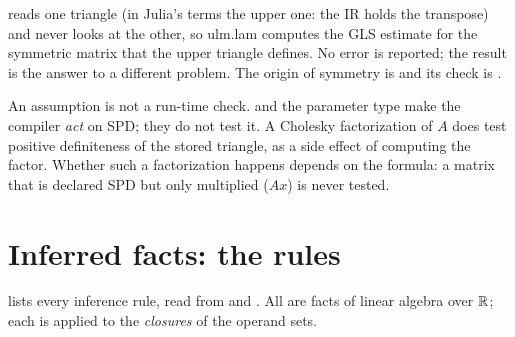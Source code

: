  reads one triangle (in Julia's terms the upper one: the IR
holds the transpose) and never looks at the other, so ulm.lam computes the
GLS estimate for the symmetric matrix that the upper triangle defines. No
error is reported; the result is the answer to a different problem. The
origin of symmetry is \Odecl{} and its check is \Onone.

\begin{limit}
An assumption is not a run-time check.  and the
parameter type  make the compiler \emph{act} on SPD;
they do not test it. A Cholesky factorization of \(A\) does test positive
definiteness of the stored triangle, as a side effect of computing the
factor. Whether such a factorization happens depends on the formula: a
matrix that is declared SPD but only multiplied (\(A x\)) is never tested.
\end{limit}

\section{Inferred facts: the rules}
\label{sec:facts-inferred}

 lists every inference rule, read from
 and
. All are facts of linear algebra
over \(\mathbb{R}\); each is applied to the \emph{closures} of the operand sets.


